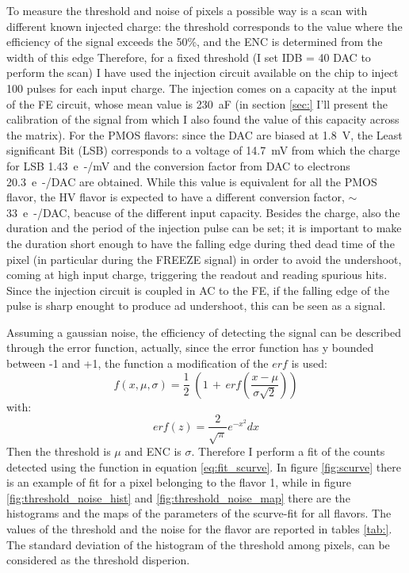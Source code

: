         To measure the threshold and noise of pixels a possible way is a scan with different known injected charge: the threshold corresponds to the value where the efficiency of the signal exceeds the 50\%, and the ENC is determined from the width of this edge         
        Therefore, for a fixed threshold (I set IDB = 40 DAC to perform the scan) I have used the injection circuit available on the chip to inject 100 pulses for each input charge. 
        The injection comes on a capacity at the input of the FE circuit, whose mean value is \SI{230}{aF} (in section \ref{sec:} I'll present the calibration of the signal from which I also found the value of this capacity across the matrix). 
        For the PMOS flavors: since the DAC are biased at \SI{1.8}{V}, the Least significant Bit (LSB) corresponds to a voltage of \SI{14.7}{mV} from which the charge for LSB \SI{1.43}{e-/mV} and the conversion factor from DAC to electrons \SI{20.3}{e-/DAC} are obtained. 
        While this value is equivalent for all the PMOS flavor, the HV flavor is expected to have a different conversion factor, $\sim$ \SI{33}{e-/DAC}, beacuse of the different input capacity. 
        Besides the charge, also the duration and the period of the injection pulse can be set; it is important to make the duration short enough to have the falling edge during thed dead time of the pixel (in particular during the FREEZE signal) in order to avoid the undershoot, coming at high input charge, triggering the readout and reading spurious hits. 
        Since the injection circuit is coupled in AC to the FE, if the falling edge of the pulse is sharp enought to produce ad undershoot, this can be seen as a signal. 

        Assuming a gaussian noise, the efficiency of detecting the signal can be described through the error function, actually, since the error function has y bounded between -1 and +1, the function a modification of the $erf$ is used: 
        \begin{equation}
            f(x, \mu, \sigma) = \frac{1}{2} \; \left(1\,+\,erf\left(\frac{x-\mu}{\sigma \sqrt{2}}\right)\right)
            \label{eq:fit_scurve}
        \end{equation}
        with: 
        \begin{equation}
            erf(z) = \frac{2}{\sqrt{\pi}} e^{-x^2} dx 
        \end{equation}  
        Then the threshold is $\mu$ and ENC is $\sigma$.
        Therefore I perform a fit of the counts detected using the function in equation \ref{eq:fit_scurve}. In figure \ref{fig:scurve} there is an example of fit for a pixel belonging to the flavor 1, while in figure \ref{fig:threshold_noise_hist} and \ref{fig:threshold_noise_map} there are the histograms and the maps of the parameters of the scurve-fit for all flavors.
        The values of the threshold and the noise for the flavor are reported in tables \ref{tab:}. 
        The standard deviation of the histogram of the threshold among pixels, can be considered as the threshold disperion.


